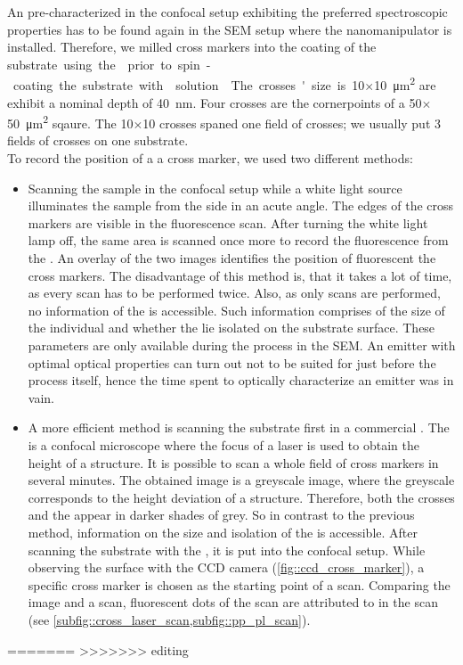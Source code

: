 	An \nd pre-characterized in the confocal setup exhibiting the preferred spectroscopic properties has to be found again in the SEM setup where the nanomanipulator is installed.
	Therefore, we milled cross markers into the \ir coating of the \si substrate using the \fib prior to spin-coating the substrate with \nd solution.
	The crosses' size is \num{10}$\times$\SI{10}{\micro\meter\squared} are exhibit a nominal depth of \SI{40}{nm}.
	Four crosses are the cornerpoints of a \num{50}$\times$\SI{50}{\micro\meter\squared} sqaure.
	The \num{10}$\times$\num{10} crosses spaned one field of crosses; we usually put 3 fields of crosses on one substrate.
	\\
	To record the position of a \nd \wrt a cross marker, we used two different methods:
	\begin{itemize}
		\item Scanning the sample in the confocal setup while a white light source illuminates the sample from the side in an acute angle. The edges of the cross markers are visible in the fluorescence scan. After turning the white light lamp off, the same area is scanned once more to record the fluorescence from the \sivs. An overlay of the two images identifies the position of fluorescent \sivs \wrt the cross markers. The disadvantage of this method is, that it takes a lot of time, as every scan has to be performed twice. Also, as only \fl scans are performed, no information of the \nds is accessible. Such information comprises of the size of the individual \nds and whether the \nds lie isolated on the substrate surface. These parameters are only available during the \pp process in the SEM. An emitter with optimal optical properties can turn out not to be suited for \pp just before the process itself, hence the time spent to optically characterize an emitter was in vain.
		\item A more efficient method is scanning the substrate first in a commercial \lsm {}. The \lsm is a confocal microscope where the focus of a laser is used to obtain the height of a structure. It is possible to scan a whole field of cross markers in several minutes. The obtained image is a greyscale image, where the greyscale corresponds to the height deviation of a structure. Therefore, both the crosses and the \nds appear in darker shades of grey. So in contrast to the previous method, information on the size and isolation of the \nds is accessible. After scanning the substrate with the \lsm, it is put into the confocal setup. While observing the surface with the CCD camera (\cref{fig::ccd_cross_marker}), a specific cross marker is chosen as the starting point of a \fl scan. Comparing the \lsm image and a \fl scan, fluorescent dots of the \fl scan are attributed to \nds in the \lsm scan (see \cref{subfig::cross_laser_scan,subfig::pp_pl_scan}).
	\end{itemize}
=======
>>>>>>> editing

